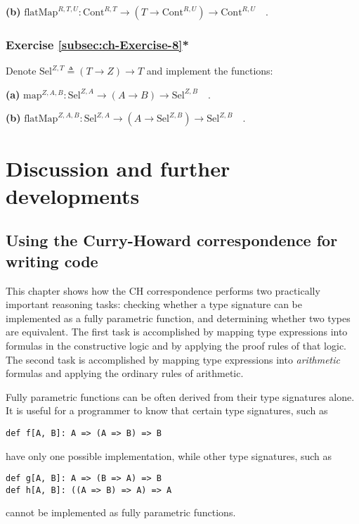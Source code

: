 \textbf{(b)} $\text{flatMap}^{R,T,U}:\text{Cont}^{R,T}\rightarrow(T\rightarrow\text{Cont}^{R,U})\rightarrow\text{Cont}^{R,U}\quad.$

\subsubsection{Exercise \label{subsec:ch-Exercise-8}\ref{subsec:ch-Exercise-8}{*}}

Denote $\text{Sel}^{Z,T}\triangleq\left(T\rightarrow Z\right)\rightarrow T$
and implement the functions:

\textbf{(a)} $\text{map}^{Z,A,B}:\text{Sel}^{Z,A}\rightarrow\left(A\rightarrow B\right)\rightarrow\text{Sel}^{Z,B}\quad.$

\textbf{(b)} $\text{flatMap}^{Z,A,B}:\text{Sel}^{Z,A}\rightarrow(A\rightarrow\text{Sel}^{Z,B})\rightarrow\text{Sel}^{Z,B}\quad.$

\section{Discussion and further developments}

\subsection{Using the Curry-Howard correspondence for writing code}

This chapter shows how the CH correspondence performs two practically
important reasoning tasks: checking whether a type signature can be
implemented as a fully parametric function, and determining whether
two types are equivalent. The first task is accomplished by mapping
type expressions into formulas in the constructive logic and by applying
the proof rules of that logic. The second task is accomplished by
mapping type expressions into \emph{arithmetic} formulas and applying
the ordinary rules of arithmetic.

Fully parametric functions can be often derived from their type signatures
alone. It is useful for a programmer to know that certain type signatures,
such as
\begin{lstlisting}
def f[A, B]: A => (A => B) => B
\end{lstlisting}
have only one possible implementation, while other type signatures,
such as
\begin{lstlisting}
def g[A, B]: A => (B => A) => B
def h[A, B]: ((A => B) => A) => A
\end{lstlisting}
cannot be implemented as fully parametric functions.

